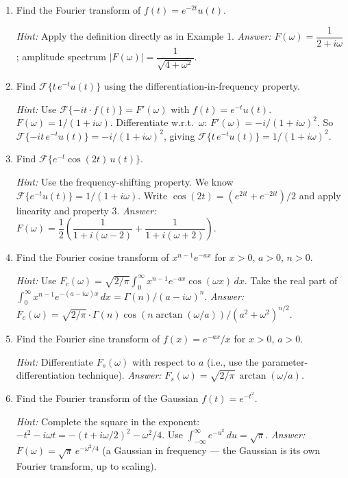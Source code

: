 \documentclass[12pt,a4paper]{article}
\begin{document}
\begin{enumerate}[label=\textbf{P\arabic*.}, leftmargin=2.5em]

\item Find the Fourier transform of $f(t) = e^{-2t}u(t)$.

\textit{Hint:} Apply the definition directly as in Example 1. \textit{Answer:} $F(\omega) = \dfrac{1}{2 + i\omega}$; amplitude spectrum $|F(\omega)| = \dfrac{1}{\sqrt{4+\omega^2}}$.

\item Find $\mathcal{F}\{t\,e^{-t}u(t)\}$ using the differentiation-in-frequency property.

\textit{Hint:} Use $\mathcal{F}\{-it\cdot f(t)\} = F'(\omega)$ with $f(t) = e^{-t}u(t)$.
$F(\omega) = 1/(1+i\omega)$. Differentiate w.r.t.\ $\omega$:
$F'(\omega) = -i/(1+i\omega)^2$.
So $\mathcal{F}\{-it\,e^{-t}u(t)\} = -i/(1+i\omega)^2$, giving $\mathcal{F}\{t\,e^{-t}u(t)\} = 1/(1+i\omega)^2$.

\item Find $\mathcal{F}\{e^{-t}\cos(2t)\,u(t)\}$.

\textit{Hint:} Use the frequency-shifting property. We know $\mathcal{F}\{e^{-t}u(t)\} = 1/(1+i\omega)$.
Write $\cos(2t) = (e^{2it}+e^{-2it})/2$ and apply linearity and property 3.
\textit{Answer:} $F(\omega) = \dfrac{1}{2}\left(\dfrac{1}{1+i(\omega-2)} + \dfrac{1}{1+i(\omega+2)}\right)$.

\item Find the Fourier cosine transform of $x^{n-1}e^{-ax}$ for $x > 0$, $a > 0$, $n > 0$.

\textit{Hint:} Use $F_c(\omega) = \sqrt{2/\pi}\int_0^\infty x^{n-1}e^{-ax}\cos(\omega x)\,dx$.
Take the real part of $\int_0^\infty x^{n-1}e^{-(a-i\omega)x}\,dx = \Gamma(n)/(a-i\omega)^n$.
\textit{Answer:} $F_c(\omega) = \sqrt{2/\pi}\cdot\Gamma(n)\cos(n\arctan(\omega/a))/(a^2+\omega^2)^{n/2}$.

\item Find the Fourier sine transform of $f(x) = e^{-ax}/x$ for $x > 0$, $a > 0$.

\textit{Hint:} Differentiate $F_s(\omega)$ with respect to $a$ (i.e., use the parameter-differentiation technique).
\textit{Answer:} $F_s(\omega) = \sqrt{2/\pi}\,\arctan(\omega/a)$.

\item Find the Fourier transform of the Gaussian $f(t) = e^{-t^2}$.

\textit{Hint:} Complete the square in the exponent: $-t^2 - i\omega t = -(t + i\omega/2)^2 - \omega^2/4$.
Use $\int_{-\infty}^{\infty} e^{-u^2}\,du = \sqrt{\pi}$.
\textit{Answer:} $F(\omega) = \sqrt{\pi}\,e^{-\omega^2/4}$ (a Gaussian in frequency --- the Gaussian is its own Fourier transform, up to scaling).

\end{enumerate}
\end{document}

